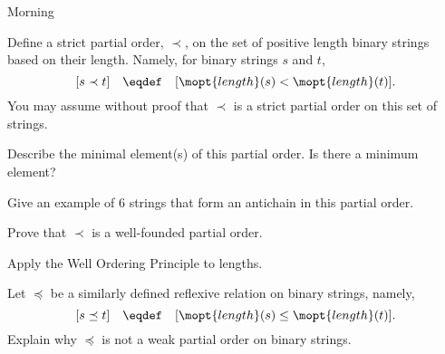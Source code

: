 \documentclass[quiz]{mcs}
\begin{document}
\begin{center}
{\Large Morning}
\end{center}




\begin{problem}[7]

  \newcommand{\FLBS}{$\mathtt{0,1}^*$}
  \newcommand{\stringlnth}[1]{\mopt{length}(#1)}
 
  Define a strict partial order, $\prec$, on the set of positive length 
  binary strings based on their length.  Namely, for binary strings $s$ 
  and $t$,
  \[
  [s \prec t]\quad \eqdef\quad [\stringlnth{s} < \stringlnth{t}].
  \]
  You may assume without proof that $\prec$ is a strict partial order on
  this set of strings.

  \bparts

  \ppart[1] Describe the minimal element(s) of this partial order.  Is there
  a minimum element?

  \ppart[1] Give an example of 6 strings that form an antichain in this
  partial order.

  \ppart[3] Prove that $\prec$ is a well-founded partial order.

  \hint Apply the Well Ordering Principle to lengths.

  \ppart[2] Let $\preceq$ be a similarly defined reflexive relation on
  binary strings, namely,
  \[
  [s \preceq t]\quad \eqdef\quad [\stringlnth{s} \leq \stringlnth{t}].
  \]
  Explain why $\preceq$ is not a weak partial order on binary strings.
 
  \eparts
\end{problem}
\inhandout{\instatements{\newpage}}


\end{document}
